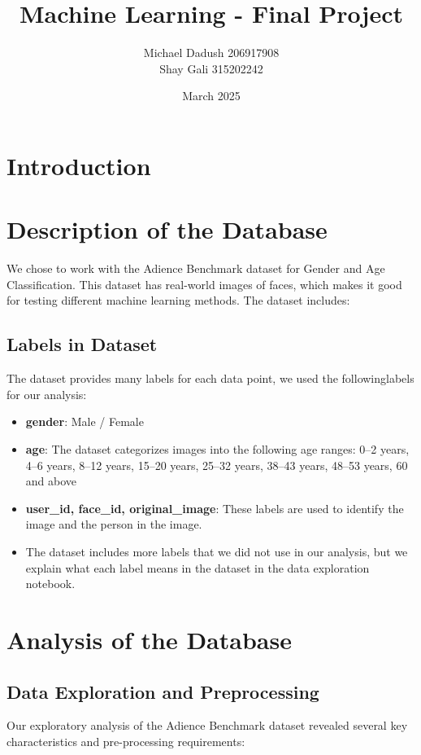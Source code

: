 \documentclass{article}
\title{Machine Learning - Final Project }
\author{Michael Dadush 206917908 \\ Shay Gali 315202242}
\date{March 2025}
\begin{document}
\maketitle


\section{Introduction}

\section{Description of the Database}
We chose to work with the Adience Benchmark dataset for Gender and Age Classification\cite{adience_dataset}. This dataset has real-world images of faces, which makes it good for testing different machine learning methods. The dataset includes:

\subsection*{Labels in Dataset}
The dataset provides many labels for each data point, we used the followinglabels for our analysis:
\begin{itemize}[leftmargin=1.6cm]
    \item \textbf{gender}: Male / Female
    \item \textbf{age}: The dataset categorizes images into the following age ranges: 0--2 years, 4--6 years, 8--12 years, 15--20 years, 25--32 years, 38--43 years, 48--53 years, 60 and above
    \item \textbf{user\_id, face\_id, original\_image}: These labels are used to identify the image and the person in the image.
    \item The dataset includes more labels that we did not use in our analysis, but we explain what each label means in the dataset in the {data exploration notebook}\cite{github_repo}.
\end{itemize}
\section{Analysis of the Database}

\subsection{Data Exploration and Preprocessing}

Our exploratory analysis of the Adience Benchmark dataset revealed several key characteristics and pre-processing requirements:
\end{document}
